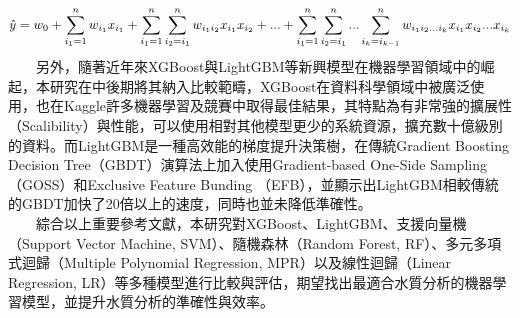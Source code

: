 \documentclass[12pt,a4paper]{article}
\begin{document}
\begin{enumerate}
\begin{enumerate}[label=\arabic*.]
    \begin{equation}
        \hat{y} = w_0 + \sum_{i_1=1}^{n} w_{i_1} x_{i_1} + \sum_{i_1=1}^{n} \sum_{i_2=i_1}^{n} w_{i_1 i_2} x_{i_1} x_{i_2} + ... \\
        + \sum_{i_1=1}^{n} \sum_{i_2=i_1}^{n} ... \sum_{i_k=i_{k-1}}^{n} w_{i_1 i_2 ... i_k} x_{i_1} x_{i_2} ... x_{i_k}
    \end{equation}
　　另外，隨著近年來XGBoost與LightGBM等新興模型在機器學習領域中的崛起，本研究在中後期將其納入比較範疇，XGBoost在資料科學領域中被廣泛使用，也在Kaggle許多機器學習及競賽中取得最佳結果，其特點為有非常強的擴展性（Scalibility）與性能，可以使用相對其他模型更少的系統資源，擴充數十億級別的資料\cite{ref9}。而LightGBM是一種高效能的梯度提升決策樹，在傳統Gradient Boosting Decision Tree（GBDT）演算法上加入使用Gradient-based One-Side Sampling（GOSS）和Exclusive Feature Bunding （EFB），並顯示出LightGBM相較傳統的GBDT加快了20倍以上的速度，同時也並未降低準確性\cite{ref10}。\\
　　綜合以上重要參考文獻，本研究對XGBoost、LightGBM、支援向量機（Support Vector Machine, SVM）、隨機森林（Random Forest, RF）、多元多項式迴歸（Multiple Polynomial Regression, MPR）以及線性迴歸（Linear Regression, LR）等多種模型進行比較與評估，期望找出最適合水質分析的機器學習模型，並提升水質分析的準確性與效率。
\end{enumerate}


\end{enumerate}
\end{document}
